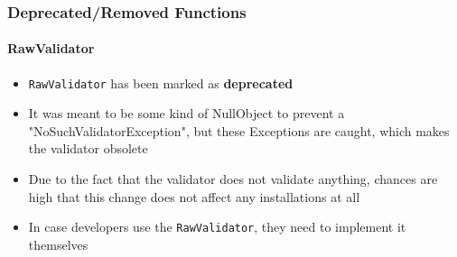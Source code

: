 %
%
%
%
%
%
%
%
%


\begin{frame}[fragile]
	\frametitle{Deprecated/Removed Functions}
	\framesubtitle{RawValidator}

	\begin{itemize}
		\item \texttt{RawValidator} has been marked as \textbf{deprecated}
		\item It was meant to be some kind of NullObject to prevent a "NoSuchValidatorException",
			but these Exceptions are caught, which makes the validator obsolete
		\item Due to the fact that the validator does not validate anything,
			chances are high that this change does not affect any installations at all
		\item In case developers use the \texttt{RawValidator}, they need to implement it themselves
	\end{itemize}


\end{frame}

